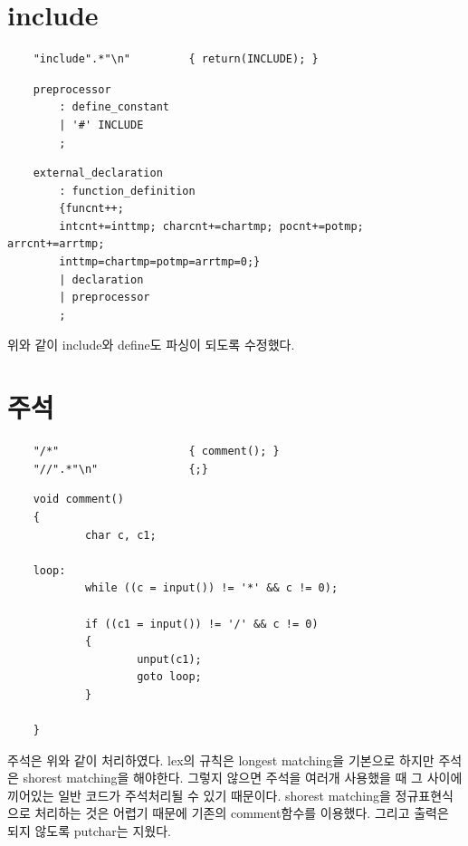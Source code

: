 \documentclass{oblivoir}
\begin{document}
\section{include}

\begin{verbatim}
    "include".*"\n"         { return(INCLUDE); }
\end{verbatim}

\begin{verbatim}
    preprocessor
        : define_constant
        | '#' INCLUDE
        ;
\end{verbatim}
\begin{verbatim}
    external_declaration
        : function_definition 
        {funcnt++; 
        intcnt+=inttmp; charcnt+=chartmp; pocnt+=potmp; arrcnt+=arrtmp; 
        inttmp=chartmp=potmp=arrtmp=0;}
        | declaration
        | preprocessor
        ;
\end{verbatim}

위와 같이 include와 define도 파싱이 되도록 수정했다.

\section{주석}
\begin{verbatim}
    "/*"                    { comment(); }
    "//".*"\n"              {;}
\end{verbatim}
\begin{verbatim}
    void comment()
    {
            char c, c1;
    
    loop:
            while ((c = input()) != '*' && c != 0);
    
            if ((c1 = input()) != '/' && c != 0)
            {
                    unput(c1);
                    goto loop;
            }
    
    }
\end{verbatim}
주석은 위와 같이 처리하였다. lex의 규칙은 longest matching을 기본으로 하지만 주석은 shorest matching을 해야한다. 그렇지 않으면 주석을 여러개 사용했을 때 그 사이에 끼어있는 일반 코드가 주석처리될 수 있기 때문이다. shorest matching을 정규표현식으로 처리하는 것은 어렵기 때문에 기존의 comment함수를 이용했다. 그리고 출력은 되지 않도록 putchar는 지웠다. 
\end{document}
